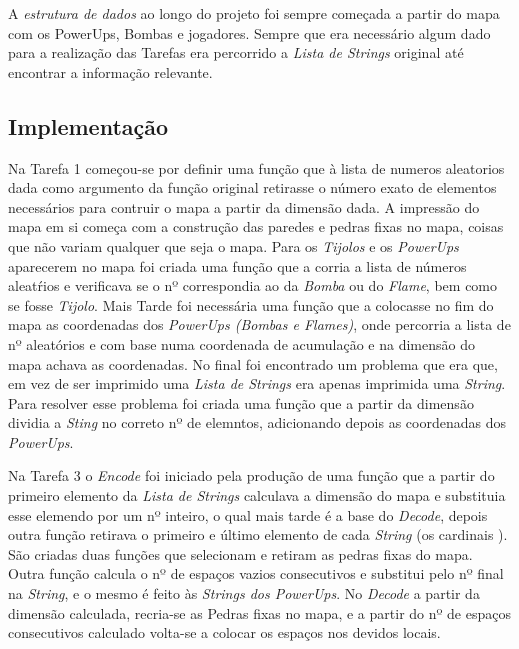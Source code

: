 \documentclass[a4paper]{article}
\begin{document}
A \emph{estrutura de dados} ao longo do projeto foi sempre começada a partir do mapa com os PowerUps, Bombas e jogadores.
Sempre que era necessário algum dado para a realização das Tarefas era percorrido a \emph{Lista de Strings} original
até encontrar a informação relevante.

\subsection{Implementação}
 
Na Tarefa 1 começou-se por definir uma função que à lista de numeros aleatorios dada como argumento da função original retirasse
o número exato de elementos necessários para contruir o mapa a partir da dimensão dada. A impressão do mapa em si começa
com a construção das paredes e pedras fixas no mapa, coisas que não variam qualquer que seja o mapa. Para os \emph{Tijolos}
 e os \emph{PowerUps} aparecerem no mapa foi criada uma função que a corria a lista de números aleatŕios e verificava se o nº correspondia 
ao da \emph{Bomba}  ou do \emph{Flame}, bem como se fosse \emph{Tijolo}. Mais Tarde foi necessária uma função que a colocasse no fim do mapa 
as coordenadas dos \emph{PowerUps (Bombas e Flames)}, onde percorria a lista de nº aleatórios e com base numa coordenada de acumulação
e na dimensão do mapa achava as coordenadas. No final foi encontrado um problema que era que, em vez de ser imprimido uma \emph{Lista de 
Strings} era apenas imprimida uma \emph{String}. Para resolver esse problema foi criada uma função que a partir da dimensão dividia a \emph{
Sting} no correto nº de elemntos, adicionando depois as coordenadas dos \emph{PowerUps}. 

Na Tarefa 3 o \emph{Encode} foi iniciado pela produção de uma função que a partir do primeiro elemento da \emph{Lista de Strings} calculava a 
dimensão do mapa e substituia esse elemendo por um nº inteiro, o qual mais tarde é a base do \emph{Decode}, depois outra função retirava o 
primeiro e último elemento de cada \emph{String} (os cardinais ). São criadas duas funções que selecionam e retiram as pedras fixas do mapa. 
Outra função calcula o nº de espaços vazios consecutivos e substitui pelo nº final na \emph{String}, e o mesmo é feito às \emph{Strings dos 
PowerUps}. No \emph{Decode} a partir da dimensão calculada, recria-se as Pedras fixas no mapa, e a partir do nº de espaços consecutivos 
calculado
volta-se a colocar os espaços nos devidos locais.
\end{document}
